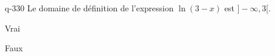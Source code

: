 \begin{truefalse}{q-330}
Le domaine de définition de l'expression $\ln(3-x)$ est $]-\infty,3[$.
\item* Vrai
\item Faux
\end{truefalse}

